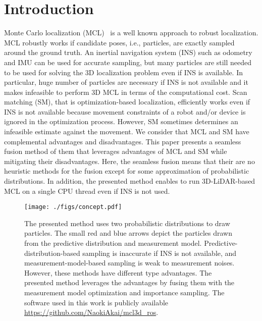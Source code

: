 \documentclass[letterpaper, 10 pt, conference]{ieeeconf}  %
\begin{document}
\section{Introduction}
\label{sec:introduction}

Monte Carlo localization (MCL)~\cite{Thrun:2005:PR:1121596} is a well known approach to robust localization.
MCL robustly works if candidate poses, i.e., particles, are exactly sampled around the ground truth.
An inertial navigation system (INS) such as odometry and IMU can be used for accurate sampling, but many particles are still needed to be used for solving the 3D localization problem even if INS is available.
In particular, huge number of particles are necessary if INS is not available and it makes infeasible to perform 3D MCL in terms of the computational cost.
Scan matching (SM), that is optimization-based localization, efficiently works even if INS is not available because movement constraints of a robot and/or device is ignored in the optimization process.
However, SM sometimes determines an infeasible estimate against the movement.
We consider that MCL and SM have complemental advantages and disadvantages.
This paper presents a seamless fusion method of them that leverages advantages of MCL and SM while mitigating their disadvantages.
Here, the seamless fusion means that their are no heuristic methods for the fusion except for some approximation of probabilistic distributions.
In addition, the presented method enables to run 3D-LiDAR-based MCL on a single CPU thread even if INS is not used.

\begin{figure}[!t]
    \begin{center}
        \texttt{[image: ./figs/concept.pdf]}
        \caption{The presented method uses two probabilistic distributions to draw particles. The small red and blue arrows depict the particles drawn from the predictive distribution and measurement model. Predictive-distribution-based sampling is inaccurate if INS is not available, and measurement-model-based sampling is weak to measurement noises. However, these methods have different type advantages. The presented method leverages the advantages by fusing them with the measurement model optimization and importance sampling. The software used in this work is publicly available \protect\url{https://github.com/NaokiAkai/mcl3d_ros}.}
        \label{fig:concept}
    \end{center}
\end{figure}
\end{document}
